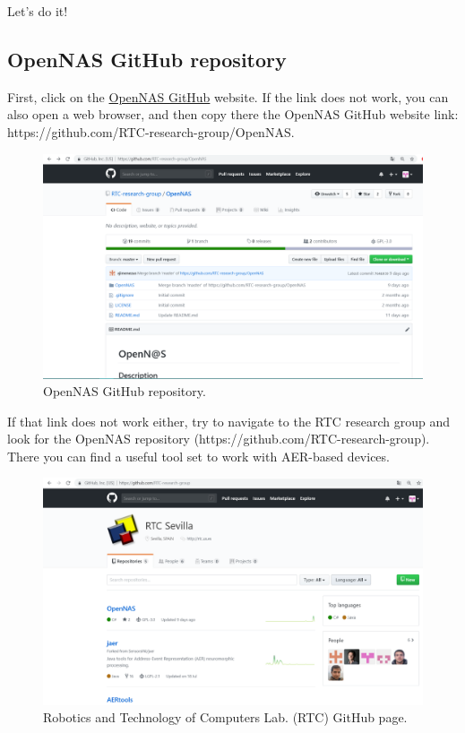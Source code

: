 Let's do it!

\subsection{OpenNAS GitHub repository}


First, click on the \textcolor{blue}{ \href{https://github.com/RTC-research-group/OpenNAS}{OpenNAS GitHub}} website. If the link does not work, you can also open a web browser, and then copy there the OpenNAS GitHub website link: https://github.com/RTC-research-group/OpenNAS.

\begin{figure}[H]
\centering
\includegraphics[width=1\textwidth]{images/Img01_OpenNAS_GitHub.PNG}
\caption{\label{fig:OpenNAS_repo}OpenNAS GitHub repository.}
\end{figure}

If that link does not work either, try to navigate to the RTC research group and look for the OpenNAS repository (https://github.com/RTC-research-group). There you can find a useful tool set to work with AER-based devices.

\begin{figure}[H]
\centering
\includegraphics[width=1\textwidth]{images/Img00_RTC_GitHub.PNG}
\caption{\label{fig:RTC_GitHub_page}Robotics and Technology of Computers Lab. (RTC) GitHub page.}
\end{figure}

